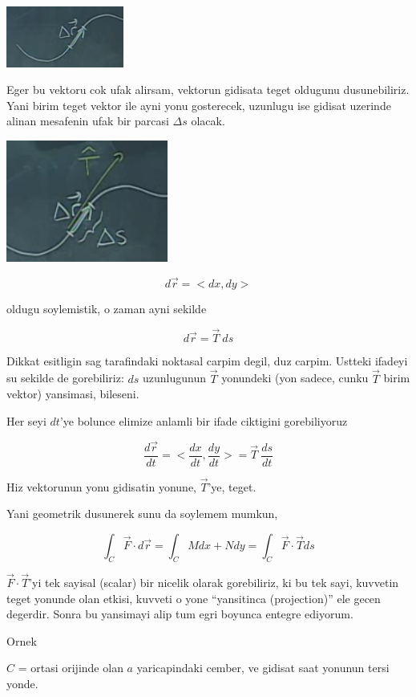\documentclass[12pt,fleqn]{article}
\begin{document}
\includegraphics[height=2cm]{19_11.png}

Eger bu vektoru cok ufak alirsam, vektorun gidisata teget oldugunu
dusunebiliriz. Yani birim teget vektor ile ayni yonu gosterecek, uzunlugu
ise gidisat uzerinde alinan mesafenin ufak bir parcasi $\Delta s$ olacak. 

\includegraphics[height=4cm]{19_12.png}

\[ d\vec{r} = <dx, dy> \]
 
oldugu soylemistik, o zaman ayni sekilde

\[  d\vec{r} = \vec{T} \ ds \]

Dikkat esitligin sag tarafindaki noktasal carpim degil, duz carpim. Ustteki
ifadeyi su sekilde de gorebiliriz: $ds$ uzunlugunun $\vec{T}$ yonundeki
(yon sadece, cunku $\vec{T}$ birim vektor) yansimasi, bileseni.

Her seyi $dt$'ye bolunce elimize anlamli bir ifade ciktigini gorebiliyoruz

\[ \frac{d\vec{r}}{dt} = <\frac{dx}{dt}, \frac{dy}{dt}> 
= \vec{T} \ \frac{ds}{dt} 
\]

Hiz vektorunun yonu gidisatin yonune, $\vec{T}$'ye, teget.

Yani geometrik dusunerek sunu da soylemem mumkun,

\[  \int_C \vec{F} \cdot d\vec{r}  = \int_C M dx + N dy
=  \int_C \vec{F} \cdot \vec{T} ds
\]

$\vec{F} \cdot \vec{T}$'yi tek sayisal (scalar) bir nicelik olarak gorebiliriz, ki bu tek 
sayi, kuvvetin teget yonunde olan etkisi, kuvveti o yone 
``yansitinca (projection)'' ele gecen degerdir. Sonra bu yansimayi alip
tum egri boyunca entegre ediyorum. 

Ornek

$C$ = ortasi orijinde olan $a$ yaricapindaki cember, ve gidisat saat
yonunun tersi yonde.
\end{document}
